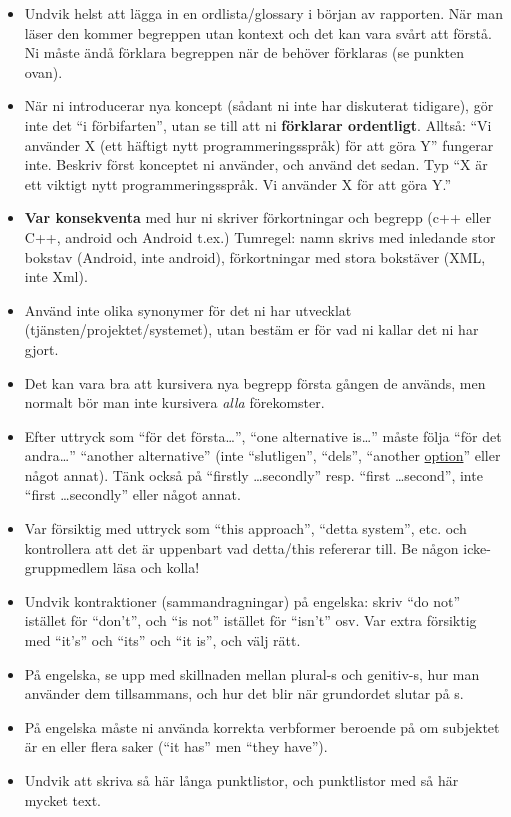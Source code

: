 \begin{itemize}
\item Undvik helst att lägga in en ordlista/glossary i början av rapporten. När man läser den kommer begreppen utan kontext och det kan vara svårt att förstå. Ni måste ändå förklara begreppen när de behöver förklaras (se punkten ovan).

\item    När ni introducerar nya koncept (sådant ni inte har diskuterat tidigare), gör inte det ``i förbifarten'', utan se till att ni \textbf{förklarar ordentligt}.  Alltså: ``Vi använder X (ett häftigt nytt programmeringsspråk) för att göra Y'' fungerar inte.  Beskriv först konceptet ni använder, och använd det sedan.  Typ ``X är ett viktigt nytt programmeringsspråk.  Vi använder X för att göra Y.''

\item    \textbf{Var konsekventa} med hur ni skriver förkortningar och begrepp (c++ eller C++, android och Android t.ex.) Tumregel: namn skrivs med inledande stor bokstav (Android, inte android), förkortningar med stora bokstäver (XML, inte Xml).

\item    Använd inte olika synonymer för det ni har utvecklat (tjänsten/projektet/systemet), utan bestäm er för vad ni kallar det ni har gjort.

\item    Det kan vara bra att kursivera nya begrepp första gången de används, men normalt bör man inte kursivera \emph{alla} förekomster.

\item    Efter uttryck som ``för det första\ldots'', ``one alternative is\ldots'' måste följa ``för det andra\ldots'' ``another alternative'' (inte ``slutligen'', ``dels'', ``another \underline{option}'' eller något annat).  Tänk också på ``firstly \ldots secondly'' resp. ``first \ldots second'', inte ``first \ldots secondly'' eller något annat.

\item    Var försiktig med uttryck som ``this approach'', ``detta system'', etc. och kontrollera att det är uppenbart vad detta/this refererar till. Be någon icke-gruppmedlem läsa och kolla!

\item Undvik kontraktioner (sammandragningar) på engelska: skriv ``do not'' istället för ``don't'', och ``is not'' istället för ``isn't'' osv. Var extra försiktig med ``it's'' och ``its'' och ``it is'', och välj rätt.

  
\item På engelska, se upp med skillnaden mellan plural-s och genitiv-s, hur man an\-vän\-der dem tillsammans, och hur det blir när grundordet slutar på s.

\item På engelska måste ni använda korrekta verbformer beroende på om subjektet är en eller flera saker (``it has'' men ``they have'').

\item Undvik att skriva så här långa punktlistor, och punktlistor med så här mycket text.
\end{itemize}


